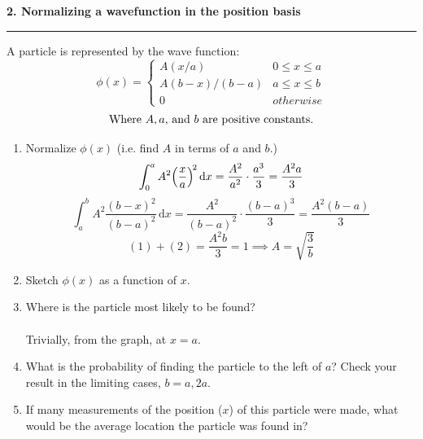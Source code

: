 \documentclass{article}
\begin{document}
\vspace{0.5cm}


\noindent \textbf{2. Normalizing a wavefunction in the position basis}
\hrule
\vspace{0.3cm}

A particle is represented by the wave function:
\[\phi(x) =  \begin{cases} 
      A(x/a) & 0 \leq x \leq a \\
      A(b-x)/(b-a) & a\leq x \leq b \\
      0 & otherwise 
   \end{cases}\]
 \[  \text{Where $A, a, $ and $ b$ are positive constants.}\]

 \begin{enumerate}[label=\alph*.]
    \item Normalize $\phi(x)$ (i.e. find $A$ in terms of $a$ and $b$.)
    \\
    \[
        \int_0^a A^2\!\left(\frac{x}{a}\right)^{\!2}\mathrm{d}x
        = \frac{A^2}{a^2}\cdot\frac{a^3}{3} = \frac{A^2 a}{3}\\[4pt]
        \]\[\int_a^b A^2\frac{(b-x)^2}{(b-a)^2}\,\mathrm{d}x
        = \frac{A^2}{(b-a)^2}\cdot\frac{(b-a)^3}{3} = \frac{A^2(b-a)}{3}
    \]\[(1) + (2) = \frac{A^2b}{3} = 1 \implies \boxed{A = \sqrt{\frac{3}{b}}}\]
    \item Sketch $\phi(x)$ as a function of $x$.
    \\
    \begin{center}
    \end{center}
    \item Where is the particle most likely to be found?
    \\ \\ 
    Trivially, from the graph, at $x = a$.
    \item What is the probability of finding the particle to the left of $a$? Check your result in the limiting cases, $b = a, 2a$.
    \item If many measurements of the position ($x$) of this particle were made, what would be the average location the particle was found in?
 \end{enumerate}
\end{document}
